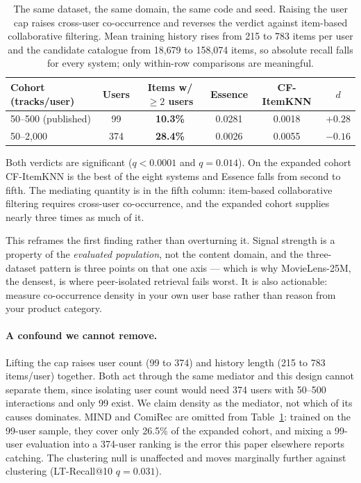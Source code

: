 \documentclass[runningheads,a4paper]{llncs}
\begin{document}
\begin{table}[tb]
\caption{The same dataset, the same domain, the same code and seed. Raising the user cap
raises cross-user co-occurrence and reverses the verdict against item-based collaborative
filtering. Mean training history rises from 215 to 783 items per user and the candidate
catalogue from 18{,}679 to 158{,}074 items, so absolute recall falls for every system;
only within-row comparisons are meaningful.}\label{tab:cohort}
\centering
\small
\begin{tabular}{@{}lccccc@{}}
\toprule
Cohort (tracks/user) & Users & Items w/ $\geq 2$ users & Essence & CF-ItemKNN & $d$ \\
\midrule
50--500 (published) & 99 & \textbf{10.3\%} & 0.0281 & 0.0018 & $\mathbf{+0.28}$ \\
50--2{,}000 & 374 & \textbf{28.4\%} & 0.0026 & 0.0055 & $\mathbf{-0.16}$ \\
\bottomrule
\end{tabular}
\end{table}

Both verdicts are significant ($q < 0.0001$ and $q = 0.014$). On the expanded cohort
CF-ItemKNN is the best of the eight systems and Essence falls from second to fifth. The
mediating quantity is in the fifth column: item-based collaborative filtering requires
cross-user co-occurrence, and the expanded cohort supplies nearly three times as much of it.

This reframes the first finding rather than overturning it. Signal strength is a property
of the \emph{evaluated population}, not the content domain, and the three-dataset pattern
is three points on that one axis --- which is why MovieLens-25M, the densest, is where
peer-isolated retrieval fails worst. It is also actionable: measure co-occurrence density
in your own user base rather than reason from your product category.

\paragraph{A confound we cannot remove.} Lifting the cap raises user count (99 to 374) and
history length (215 to 783 items/user) together. Both act through the same mediator and
this design cannot separate them, since isolating user count would need 374 users with
50--500 interactions and only 99 exist. We claim density as the mediator, not which of its
causes dominates. MIND and ComiRec are omitted from
Table~\ref{tab:cohort}: trained on the 99-user sample, they cover only 26.5\% of the
expanded cohort, and mixing a 99-user evaluation into a 374-user ranking is the error this
paper elsewhere reports catching. The clustering null is unaffected and moves marginally
further against clustering (LT-Recall@10 $q = 0.031$).
\end{document}
